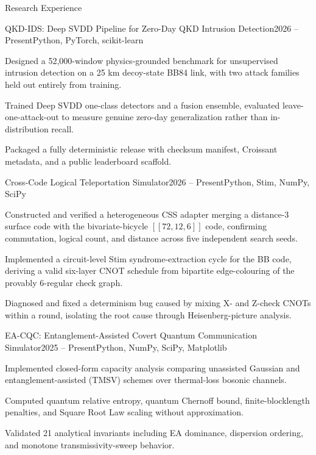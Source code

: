 \documentclass{resume} %
\begin{document}
\begin{rSection}{Research Experience}
\begin{rSubsection}{QKD-IDS: Deep SVDD Pipeline for Zero-Day QKD Intrusion Detection}{2026 – Present}{Python, PyTorch, scikit-learn}{}
\item Designed a 52,000-window physics-grounded benchmark for unsupervised intrusion detection on a 25 km decoy-state BB84 link, with two attack families held out entirely from training.
\item Trained Deep SVDD one-class detectors and a fusion ensemble, evaluated leave-one-attack-out to measure genuine zero-day generalization rather than in-distribution recall.
\item Packaged a fully deterministic release with checksum manifest, Croissant metadata, and a public leaderboard scaffold.
\end{rSubsection}
\vspace{.1cm}

\begin{rSubsection}{Cross-Code Logical Teleportation Simulator}{2026 – Present}{Python, Stim, NumPy, SciPy}{}
\item Constructed and verified a heterogeneous CSS adapter merging a distance-3 surface code with the bivariate-bicycle $[[72,12,6]]$ code, confirming commutation, logical count, and distance across five independent search seeds.
\item Implemented a circuit-level Stim syndrome-extraction cycle for the BB code, deriving a valid six-layer CNOT schedule from bipartite edge-colouring of the provably 6-regular check graph.
\item Diagnosed and fixed a determinism bug caused by mixing X- and Z-check CNOTs within a round, isolating the root cause through Heisenberg-picture analysis.
\end{rSubsection}
\vspace{.1cm}

\begin{rSubsection}{EA-CQC: Entanglement-Assisted Covert Quantum Communication Simulator}{2025 – Present}{Python, NumPy, SciPy, Matplotlib}{}
\item Implemented closed-form capacity analysis comparing unassisted Gaussian and entanglement-assisted (TMSV) schemes over thermal-loss bosonic channels.
\item Computed quantum relative entropy, quantum Chernoff bound, finite-blocklength penalties, and Square Root Law scaling without approximation.
\item Validated 21 analytical invariants including EA dominance, dispersion ordering, and monotone transmissivity-sweep behavior.
\end{rSubsection}
\vspace{.1cm}


\end{rSection}
\end{document}
